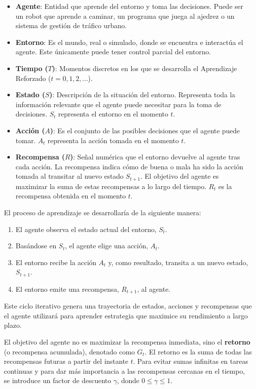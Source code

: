 \documentclass[12pt,a4paper]{book}
\begin{document}
\begin{itemize}
    \item \textbf{Agente}: Entidad que aprende del entorno y toma las decisiones. Puede ser un robot que aprende a caminar, un programa que juega al ajedrez o un sistema de gestión de tráfico urbano.
    \item \textbf{Entorno}: Es el mundo, real o simulado, donde se encuentra e interactúa el agente. Este únicamente puede tener control parcial del entorno.
    \item \textbf{Tiempo ($T$)}: Momentos discretos en los que se desarrolla el Aprendizaje Reforzado ($t=0, 1, 2, \dots$).
    \item \textbf{Estado ($S$)}: Descripción de la situación del entorno. Representa toda la información relevante que el agente puede necesitar para la toma de decisiones. $S_t$ representa el entorno en el momento $t$.
    \item \textbf{Acción ($A$)}: Es el conjunto de las posibles decisiones que el agente puede tomar. $A_t$ representa la acción tomada en el momento $t$.
    \item \textbf{Recompensa ($R$)}: Señal numérica que el entorno devuelve al agente tras cada acción. La recompensa indica cómo de buena o mala ha sido la acción tomada al transitar al nuevo estado $S_{t+1}$. El objetivo del agente es maximizar la suma de estas recompensas a lo largo del tiempo. $R_t$ es la recompensa obtenida en el momento $t$.
\end{itemize}

El proceso de aprendizaje se desarrollaría de la siguiente manera:
\begin{enumerate}
    \item El agente observa el estado actual del entorno, $S_t$.
    \item Basándose en $S_t$, el agente elige una acción, $A_t$.
    \item El entorno recibe la acción $A_t$ y, como resultado, transita a un nuevo estado, $S_{t+1}$.
    \item El entorno emite una recompensa, $R_{t+1}$, al agente.
\end{enumerate}
Este ciclo iterativo genera una trayectoria de estados, acciones y recompensas que el agente utilizará para aprender estrategia que maximice su rendimiento a largo plazo.

El objetivo del agente no es maximizar la recompensa inmediata, sino el \textbf{retorno} (o recompensa acumulada), denotado como $G_t$.
El retorno es la suma de todas las recompensas futuras a partir del instante $t$. 
Para evitar sumas infinitas en tareas continuas y para dar más importancia a las recompensas cercanas en el tiempo, se introduce un factor de descuento $\gamma$, donde $0 \le \gamma \le 1$.
\end{document}
